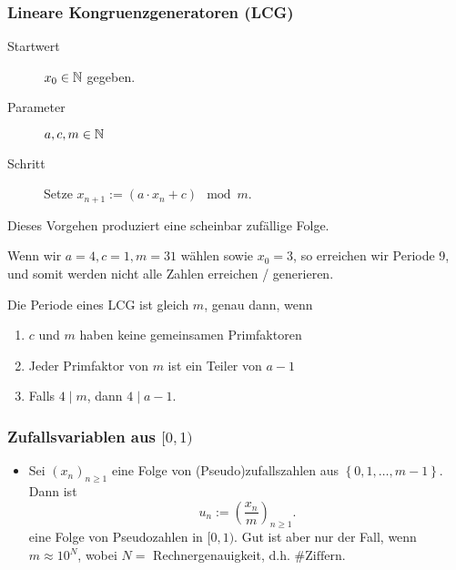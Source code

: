 \subsubsection{Lineare Kongruenzgeneratoren (LCG)}
\begin{description}
    \item[Startwert] $x_0\in \mathbb{N}$ gegeben.
    \item[Parameter] $a,c,m\in \mathbb{N}$
    \item[Schritt] Setze $x_{n+1} := (a\cdot x_n + c) \mod m$.
\end{description}
Dieses Vorgehen produziert eine scheinbar zufällige Folge.
\begin{example}
    \begin{comment}
    \begin{table}[htpb]
        \centering
        \caption{LCG-Generator}
        \label{tab:LCG-Beispiele}
        \begin{tabular}{r|c|c|c}
            & m & a & c
            ZX81 & $2^{16}+1$ & 75 & 0 \\
            \sc RANDN & & & \\
            Marsaglia & $2^{32}$
        \end{tabular}
    \end{table}
    \end{comment}
\end{example}
\begin{example}
    Wenn wir $a=4, c=1, m=31$ wählen sowie  $x_0 = 3$,  so erreichen wir Periode 9, und somit werden nicht alle Zahlen erreichen / generieren.
\end{example}
\begin{lemma}[Knuth]
    Die Periode eines LCG ist gleich $m$, genau dann, wenn
     \begin{enumerate}[label=\protect\circled{\alph*}]
        \item $c$ und  $m$ haben keine gemeinsamen Primfaktoren
        \item Jeder Primfaktor von  $m$ ist ein Teiler von  $a-1$ 
        \item Falls $4 \mid m$, dann $4 \mid  a-1$.
    \end{enumerate}
    \label{lm:knuth}
\end{lemma}
\begin{example}
    
\end{example}

\subsubsection{Zufallsvariablen aus $[0,1)$}
 \begin{itemize}
     \item Sei $(x_n)_{n\geq 1}$ eine Folge von (Pseudo)zufallszahlen aus $\left \{0,1,\ldots,m-1\right\} $. Dann ist
         \[
             u_n := \left(\frac{x_n}{m}\right)_{n\geq 1}
         .\] 
         eine Folge von Pseudozahlen in $[0,1)$. Gut ist aber nur der Fall, wenn $m\approx 10^N$, wobei $N=$ Rechnergenauigkeit, d.h. $\#\text{Ziffern}$.
\end{itemize}
